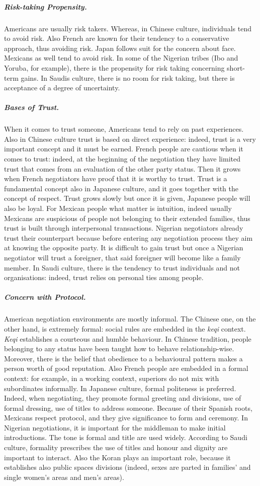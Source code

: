 \documentclass[../main.tex]{subfiles}
\begin{document}
\subparagraph{Risk-taking Propensity.} Americans are usually risk takers. Whereas, in Chinese culture, individuals tend to avoid risk. Also French are known for their tendency to a conservative approach, thus avoiding risk. Japan follows suit for the concern about face. Mexicans as well tend to avoid risk. In some of the Nigerian tribes (Ibo and Yoruba, for example), there is the propensity for risk taking concerning short-term gains. In Saudis culture, there is no room for risk taking, but there is acceptance of a degree of uncertainty.

\subparagraph{Bases of Trust.} When it comes to trust someone, Americans tend to rely on past experiences. Also in Chinese culture trust is based on direct experience: indeed, trust is a very important concept and it must be earned. French people are cautious when it comes to trust: indeed, at the beginning of the negotiation they have limited trust that comes from an evaluation of the other party status. Then it grows when French negotiators have proof that it is worthy to trust. Trust is a fundamental concept also in Japanese culture, and it goes together with the concept of respect. Trust grows slowly but once it is given, Japanese people will also be loyal. For Mexican people what matter is intuition, indeed usually Mexicans are suspicious of people not belonging to their extended families, thus trust is built through interpersonal transactions. Nigerian negotiators already trust their counterpart because before entering any negotiation process they aim at knowing the opposite party. It is difficult to gain trust but once a Nigerian negotiator will trust a foreigner, that said foreigner will become like a family member. In Saudi culture, there is the tendency to trust individuals and not organisations: indeed, trust relies on personal ties among people.

\subparagraph{Concern with Protocol.} American negotiation environments are mostly informal. The Chinese one, on the other hand, is extremely formal: social rules are embedded in the \textit{keqi} context. \textit{Keqi} establishes a courteous and humble behaviour. In Chinese tradition, people belonging to any status have been taught how to behave relationship-wise. Moreover, there is the belief that obedience to a behavioural pattern makes a person worth of good reputation. Also French people are embedded in a formal context: for example, in a working context, superiors do not mix with subordinates informally. In Japanese culture, formal politeness is preferred. Indeed, when negotiating, they promote formal greeting and divisions, use of formal dressing, use of titles to address someone. Because of their Spanish roots, Mexicans respect protocol, and they give significance to form and ceremony. In Nigerian negotiations, it is important for the middleman to make initial introductions. The tone is formal and title are used widely. According to Saudi culture, formality prescribes the use of titles and honour and dignity are important to interact. Also the Koran plays an important role, because it establishes also public spaces divisions (indeed, sexes are parted in families' and single women's areas and men's areas).
\end{document}
